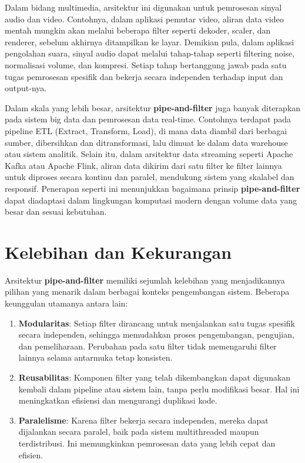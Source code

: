 Dalam bidang multimedia, arsitektur ini digunakan untuk pemrosesan sinyal audio dan video. Contohnya, dalam aplikasi pemutar video, aliran data video mentah mungkin akan melalui beberapa filter seperti dekoder, scaler, dan renderer, sebelum akhirnya ditampilkan ke layar. Demikian pula, dalam aplikasi pengolahan suara, sinyal audio dapat melalui tahap-tahap seperti filtering noise, normalisasi volume, dan kompresi. Setiap tahap bertanggung jawab pada satu tugas pemrosesan spesifik dan bekerja secara independen terhadap input dan output-nya.

Dalam skala yang lebih besar, arsitektur \textbf{pipe-and-filter} juga banyak diterapkan pada sistem big data dan pemrosesan data real-time. Contohnya terdapat pada pipeline ETL (Extract, Transform, Load), di mana data diambil dari berbagai sumber, dibersihkan dan ditransformasi, lalu dimuat ke dalam data warehouse atau sistem analitik. Selain itu, dalam arsitektur data streaming seperti Apache Kafka atau Apache Flink, aliran data dikirim dari satu filter ke filter lainnya untuk diproses secara kontinu dan paralel, mendukung sistem yang skalabel dan responsif. Penerapan seperti ini menunjukkan bagaimana prinsip \textbf{pipe-and-filter} dapat diadaptasi dalam lingkungan komputasi modern dengan volume data yang besar dan sesuai kebutuhan.


\section{Kelebihan dan Kekurangan}

Arsitektur \textbf{pipe-and-filter} memiliki sejumlah kelebihan yang menjadikannya pilihan yang menarik dalam berbagai konteks pengembangan sistem. Beberapa keunggulan utamanya antara lain:

\begin{enumerate}
	\item \textbf{Modularitas}: Setiap filter dirancang untuk menjalankan satu tugas spesifik secara independen, sehingga memudahkan proses pengembangan, pengujian, dan pemeliharaan. Perubahan pada satu filter tidak memengaruhi filter lainnya selama antarmuka tetap konsisten.
	
	\item \textbf{Reusabilitas}: Komponen filter yang telah dikembangkan dapat digunakan kembali dalam pipeline atau sistem lain, tanpa perlu modifikasi besar. Hal ini meningkatkan efisiensi dan mengurangi duplikasi kode.
	
	\item \textbf{Paralelisme}: Karena filter bekerja secara independen, mereka dapat dijalankan secara paralel, baik pada sistem multithreaded maupun terdistribusi. Ini memungkinkan pemrosesan data yang lebih cepat dan efisien.
\end{enumerate}

